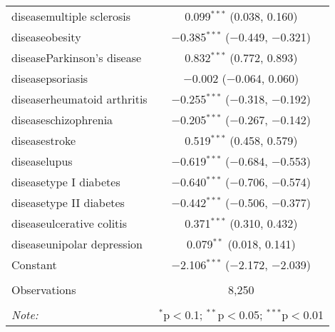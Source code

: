\begin{table}[!htbp]
\begin{tabular}{@{\extracolsep{5pt}}lc}
  diseasemultiple sclerosis & 0.099$^{***}$ (0.038, 0.160) \\ 
  diseaseobesity & $-$0.385$^{***}$ ($-$0.449, $-$0.321) \\ 
  diseaseParkinson's disease & 0.832$^{***}$ (0.772, 0.893) \\ 
  diseasepsoriasis & $-$0.002 ($-$0.064, 0.060) \\ 
  diseaserheumatoid arthritis & $-$0.255$^{***}$ ($-$0.318, $-$0.192) \\ 
  diseaseschizophrenia & $-$0.205$^{***}$ ($-$0.267, $-$0.142) \\ 
  diseasestroke & 0.519$^{***}$ (0.458, 0.579) \\ 
  diseaselupus & $-$0.619$^{***}$ ($-$0.684, $-$0.553) \\ 
  diseasetype I diabetes & $-$0.640$^{***}$ ($-$0.706, $-$0.574) \\ 
  diseasetype II diabetes & $-$0.442$^{***}$ ($-$0.506, $-$0.377) \\ 
  diseaseulcerative colitis & 0.371$^{***}$ (0.310, 0.432) \\ 
  diseaseunipolar depression & 0.079$^{**}$ (0.018, 0.141) \\ 
  Constant & $-$2.106$^{***}$ ($-$2.172, $-$2.039) \\ 
 \hline \\[-1.8ex] 
Observations & 8,250 \\ 
\hline 
\hline \\[-1.8ex] 
\textit{Note:}  & \multicolumn{1}{r}{$^{*}$p$<$0.1; $^{**}$p$<$0.05; $^{***}$p$<$0.01} \\ 
\end{tabular} 
\end{table} 
